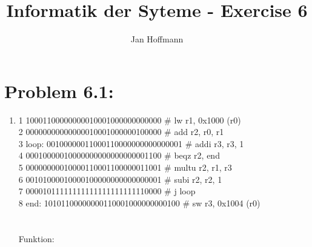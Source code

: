 \documentclass[10pt,a4paper]{article}
\title{Informatik der Syteme - Exercise 6}
\author{Jan Hoffmann}
\begin{document}
\section*{Problem 6.1:}
\begin{enumerate}
  \item 1       10001100000000010001000000000000 \# lw r1, 0x1000 (r0) \\
				2       00000000000000010001000000100000 \# add r2, r0, r1 \\
				3 loop: 00100000011000110000000000000001 \# addi r3, r3, 1 \\
				4       00010000010000000000000000001100 \# beqz r2, end \\
				5       00000000010000110001100000011001 \# multu r2, r1, r3 \\
				6       00101000010000100000000000000001 \# subi r2, r2, 1 \\
				7       00001011111111111111111111110000 \# j loop \\
				8	end:	10101100000000110001000000000100 \# sw r3, 0x1004 (r0) \\\\\\
	
	  Funktion: 
				
 		
\end{enumerate}
\end{document}
